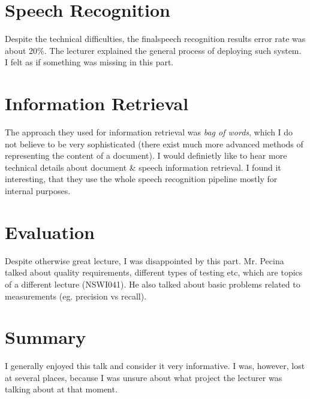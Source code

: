\documentclass[a4paper]{article}
\begin{document}
\section*{Speech Recognition}

Despite the technical difficulties, the finalspeech recognition results error rate was about 20\%. The lecturer explained the general process of deploying such system. I felt as if something was missing in this part.

\section*{Information Retrieval}

The approach they used for information retrieval was \textit{bag of words}, which I do not believe to be  very sophisticated (there exist much more advanced methods of representing the content of a document). I would definietly like to hear more technical details about document \& speech information retrieval. I found it interesting, that they use the whole speech recognition pipeline mostly for internal purposes.

\section*{Evaluation}

Despite otherwise great lecture, I was disappointed by this part. Mr. Pecina talked about quality requirements, different types of testing etc, which are topics of a different lecture (NSWI041). He also talked about basic problems related to measurements (eg. precision vs recall).

\section*{Summary}

I generally enjoyed this talk and consider it very informative. I was, however, lost at several places, because I was unsure about what project the lecturer was talking about at that moment.
\end{document}
